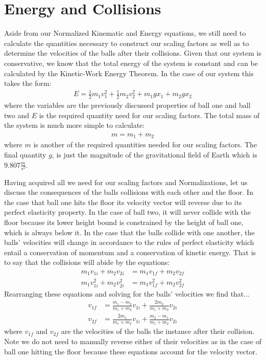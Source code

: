 \documentclass[twocolumn]{article}
\begin{document}
\section{Energy and Collisions}
\hspace{\parindent} Aside from our Normalized Kinematic and Energy equations, we still need to calculate the quantities necessary to construct our scaling factors as well as to determine the velocities of the balls after their collisions. Given that our system is conservative, we know that the total energy of the system is constant and can be calculated by the Kinetic-Work Energy Theorem. In the case of our system this takes the form:
\begin{align}
	E = \frac{1}{2}m_1v_1^{2} + \frac{1}{2}m_2v_2^{2} + m_1gx_1 + m_2gx_2
\end{align}
where the variables are the previously discussed properties of ball one and ball two and $E$ is the required quantity need for our scaling factors. The total mass of the system is much more simple to calculate:
\begin{align}
	m = m_1 + m_2
\end{align}
where $m$ is another of the required quantities needed for our scaling factors. The final quantity $g$, is just the magnitude of the gravitational field of Earth which is $9.807 \frac{m}{s^{2}}$.

Having acquired all we need for our scaling factors and Normalizations, let us discuss the consequences of the balls collisions with each other and the floor. In the case that ball one hits the floor its velocity vector will reverse due to its perfect elasticity property. In the case of ball two, it will never collide with the floor because its lower height bound is constrained by the height of ball one, which is always below it. In the case that the balls collide with one another, the balls' velocities will change in accordance to the rules of perfect elasticity which entail a conservation of momentum and a conservation of kinetic energy. That is to say that the collisions will abide by the equations:
\begin{align}
	m_1v_{1i} + m_2v_{2i} &= m_1v_{1f} + m_2v_{2f} \\
	m_1v_{1i}^{2} + m_2v_{2i}^2 &= m_1v_{1f}^{2} + m_2v_{2f}^{2}
\end{align}
Rearranging these equations and solving for the balls' velocities we find that...
\begin{align}
	v_{1f} &= \frac{m_1-m_2}{m_1+m_2}v_{1i} +\frac{2m_2}{m_1+m_2}v_{2i} \\
	v_{2f} &= \frac{2m_1}{m_1+m_2}v_{1i} + \frac{m_2-m_1}{m_1+m_2}v_{2i}
\end{align}
where $v_{1f}$ and $v_{2f}$ are the velocities of the balls the instance after their collision. Note we do not need to manually reverse either of their velocities as in the case of ball one hitting the floor because these equations account for the velocity vector.
\end{document}

